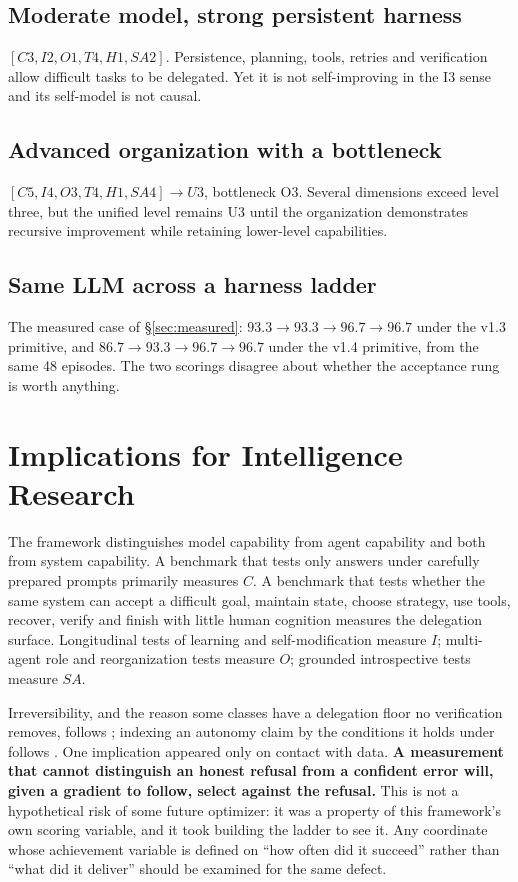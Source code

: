 \documentclass[11pt]{article}
\theoremstyle{definition}
\begin{document}
\subsection{Moderate model, strong persistent harness}
$[C3, I2, O1, T4, H1, SA2]$. Persistence, planning, tools, retries and verification allow difficult tasks to be delegated. Yet it is not self-improving in the I3 sense and its self-model is not causal.

\subsection{Advanced organization with a bottleneck}
$[C5, I4, O3, T4, H1, SA4] \to U3$, bottleneck O3. Several dimensions exceed level three, but the unified level remains U3 until the organization demonstrates recursive improvement while retaining lower-level capabilities.

\subsection{Same LLM across a harness ladder}
The measured case of \S\ref{sec:measured}: $93.3 \to 93.3 \to 96.7 \to 96.7$ under the v1.3 primitive, and $86.7 \to 93.3 \to 96.7 \to 96.7$ under the v1.4 primitive, from the same 48 episodes. The two scorings disagree about whether the acceptance rung is worth anything.

\section{Implications for Intelligence Research}

The framework distinguishes model capability from agent capability and both from system capability. A benchmark that tests only answers under carefully prepared prompts primarily measures $C$. A benchmark that tests whether the same system can accept a difficult goal, maintain state, choose strategy, use tools, recover, verify and finish with little human cognition measures the delegation surface. Longitudinal tests of learning and self-modification measure $I$; multi-agent role and reorganization tests measure $O$; grounded introspective tests measure $SA$.

Irreversibility, and the reason some classes have a delegation floor no verification removes, follows \citet{perrow1984}; indexing an autonomy claim by the conditions it holds under follows \citet{sae2021j3016}. One implication appeared only on contact with data. \textbf{A measurement that cannot distinguish an honest refusal from a confident error will, given a gradient to follow, select against the refusal.} This is not a hypothetical risk of some future optimizer: it was a property of this framework's own scoring variable, and it took building the ladder to see it. Any coordinate whose achievement variable is defined on ``how often did it succeed'' rather than ``what did it deliver'' should be examined for the same defect.
\end{document}
